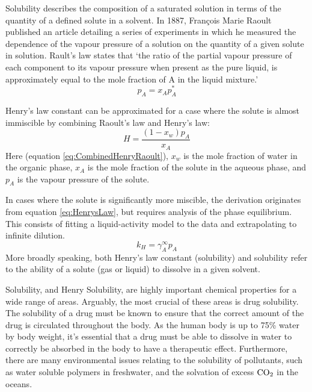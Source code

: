 \documentclass[11pt, titlepage]{article}
\begin{document}
Solubility describes the composition of a saturated solution in terms of the quantity of a defined solute in a solvent\cite{IUPAC_SolubilityDefinition}. In 1887, François Marie Raoult published an article detailing a series of  experiments in which he measured the dependence of the vapour pressure of a solution on the quantity of a given solute in solution\cite{APS_Raoult, RaoultTranslation}. Rault's law states that `the ratio of the partial vapour pressure of each component to its vapour pressure when present as the pure liquid, is approximately equal to the mole fraction of A in the liquid mixture.'\cite{Atkins}
\begin{equation}
	p_A = x_A p^*_A
	\label{eq:RaoultsLaw}
\end{equation}

Henry's law constant can be approximated for a case where the solute is almost immiscible by combining Raoult's law and Henry's law\cite{HLPitfalls}:
\begin{equation}
	H = \frac{(1-x_w)p_A}{x_A}
	\label{eq:CombinedHenryRaoult}
\end{equation}
Here (equation \ref{eq:CombinedHenryRaoult}), $x_w$ is the mole fraction of water in the organic phase, $x_A$ is the mole fraction of the solute in the aqueous phase, and $p_A$ is the vapour pressure of the solute.

In cases where the solute is significantly more miscible, the derivation originates from equation \ref{eq:HenrysLaw}, but requires analysis of the phase equilibrium. This consists of fitting a liquid-activity model to the data and extrapolating to infinite dilution\cite{HLPitfalls}. 
\begin{equation}
	k_H = \gamma_A^{\infty} p_A
\end{equation}
More broadly speaking, both Henry's law constant (solubility) and solubility refer to the ability of a solute (gas or liquid) to dissolve in a given solvent.

Solubility, and Henry Solubility, are highly important chemical properties for a wide range of areas. Arguably, the most crucial of these areas is drug solubility. The solubility of a drug must be known to ensure that the correct amount of the drug is circulated throughout the body\cite{DrugSolubility}. As the human body is up to 75\% water by body weight\cite{WaterInBody}, it's essential that a drug must be able to dissolve in water to correctly be absorbed in the body to have a therapeutic effect.  Furthermore, there are many environmental issues relating to the solubility of pollutants, such as water soluble polymers in freshwater\cite{WaterPollution}, and the solvation of excess $\ce{CO2}$ in the oceans\cite{EnvironmentHL}.
\end{document}
